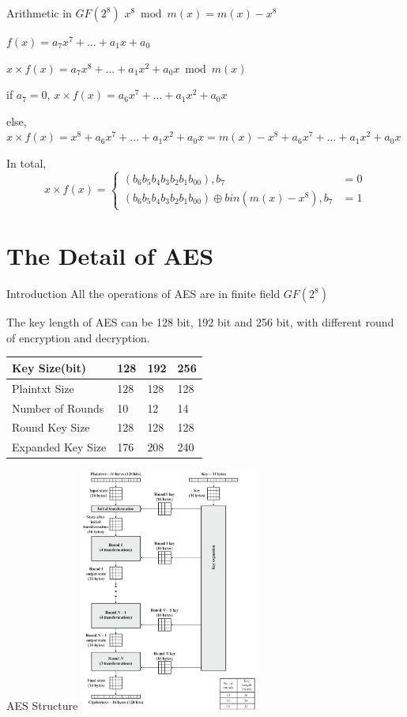 \documentclass{beamer}
\begin{document}
\begin{frame}{Arithmetic in $GF(2^8)$}
	$x^8 \bmod m(x) = m(x) - x^8$

	$f(x) = a_7 x^7 + ... + a_1x+a_0$

	$x \times f(x) = a_{7} x^{8} + ... + a_1x^2+a_0x \bmod m(x)$

	if $a_7 = 0$, $x \times f(x) =a_6x^7 +...+ a_1x^2+a_0x$

	else, $x \times f(x) =x^8 + a_6x^7 + ...+a_1x^2+a_0x = m(x) - x^8 + a_6x^7 +...+ a_1x^2+a_0x$

	In total,
	$$ x\times f(x)=\left\{
		\begin{aligned}
			(b_6b_5b_4b_3b_2b_1b_00), b_7                      & = 0 \\
			(b_6b_5b_4b_3b_2b_1b_00) \oplus bin(m(x)-x^8), b_7 & = 1
		\end{aligned}
		\right.
	$$
\end{frame}

\section{The Detail of AES}
\begin{frame}{Introduction}
	All the operations of AES are in finite field $GF(2^8)$

	The key length of AES can be 128 bit, 192 bit and 256 bit, with different round of encryption and decryption.
	\begin{table}[]
		\begin{tabular}{|l|l|l|l|}
			\hline
			Key Size(bit)     & 128 & 192 & 256 \\ \hline
			Plaintxt Size     & 128 & 128 & 128 \\ \hline
			Number of Rounds  & 10  & 12  & 14  \\ \hline
			Round Key Size    & 128 & 128 & 128 \\ \hline
			Expanded Key Size & 176 & 208 & 240 \\ \hline
		\end{tabular}
	\end{table}
\end{frame}

\begin{frame}{AES Structure}
	\includegraphics[width=2.3in]{fig/structrue.png}
\end{frame}
\end{document}
